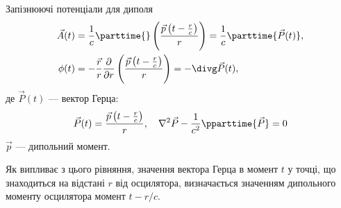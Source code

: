 \documentclass[9pt]{beamer}
\let\vect\vec
\begin{document}
\begin{frame}{Запізнюючі потенціали для диполя}{}
	\begin{align*}
		\vect{A}(t) & = \frac1c \parttime{}\left( \frac{\vect{p}\left(t - \frac{r}{c}\right)}{r} \right)  = \frac1c \parttime{\vect{P}(t)},                \\
		\phi(t)     & = -\frac{\vect{r}}{r} \frac{\partial}{\partial r}\left( \frac{\vect{p}\left(t - \frac{r}{c}\right)}{r} \right) =  -\divg\vect{P}(t),
	\end{align*}
	де $ \vect{P}(t) $ --- вектор Герца:
	\begin{equation*}
		\vect{P}(t) = \frac{\vect{p}\left(t - \frac{r}{c}\right)}{r}, \quad \nabla^2\vect{P} - \frac{1}{c^2}\pparttime{\vect{P}} = 0
	\end{equation*}
	$ \vect{p} $ --- дипольний момент.

	\begin{block}{}\small\justifying
		Як випливає з цього рівняння, значення вектора Герца в
		момент $ t $ у точці, що знаходиться на відстані $ r $ від осцилятора,
		визначається значенням дипольного моменту осцилятора
		момент $ t - r / c $.
	\end{block}{}
\end{frame}
\end{document}
